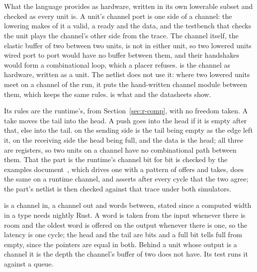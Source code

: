 \section{}
\label{sec:r-parts}

What the language provides as hardware, written in its own lowerable
subset and checked as every unit is. A unit's channel port is one
side of a channel: the lowering makes of it a valid, a ready and the
data, and the testbench that checks the unit plays the channel's
other side from the trace. The channel itself, the elastic buffer of
two between two units, is not in either unit, so two lowered units
wired port to port would have no buffer between them, and their
handshakes would form a combinational loop, which a placer refuses.
 is the channel as hardware, written as a unit.
The netlist does not use it: where two lowered units meet on a
channel of the run, it puts the hand-written channel module
 between them, which keeps the same rules.
 is what  and the datasheets show.

Its rules are the runtime's, from Section~\ref{sec:r-comp}, with no
freedom taken. A take moves the tail into the head. A push goes into
the head if it is empty after that, else into the tail. 
on the sending side is the tail being empty as the edge left it,
 on the receiving side the head being full, and the data
is the head; all three are registers, so two units on a channel have
no combinational path between them. That the part is the runtime's
channel bit for bit is checked by the examples
document~\cite{examples}, which drives one with a pattern of offers
and takes, does the same on a runtime channel, and asserts after
every cycle that the two agree; the part's netlist is then checked
against that trace under both simulators.



 is a channel in, a channel out and
 words between,  stated since a computed width in a
type needs nightly Rust. A word is taken from the input whenever
there is room and the oldest word is offered on the output whenever
there is one, so the latency is one cycle; the head and the tail are
 bits and a full bit tells full from empty, since the
pointers are equal in both. Behind a unit whose output is a channel
it is the depth the channel's buffer of two does not have. Its test
runs it against a queue.

